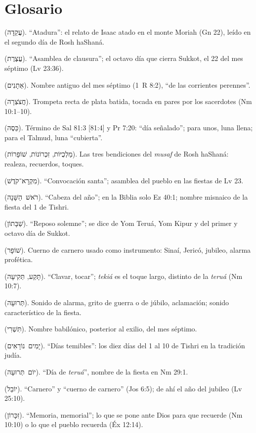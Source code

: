 \documentclass[11pt,letterpaper]{article}
\newcommand{\heb}[1]{\mbox{\foreignlanguage{hebrew}{#1}}}
\begin{document}
\section*{Glosario}
\begin{description}\setlength{\itemsep}{1pt}
\item[\emph{Aqedá}] (\heb{עֲקֵדָה}). ``Atadura'': el relato de Isaac atado en el monte Moriah (Gn 22), leído en el segundo día de Rosh haShaná.
\item[\emph{Atséret}] (\heb{עֲצֶרֶת}). ``Asamblea de clausura''; el octavo día que cierra Sukkot, el 22 del mes séptimo (Lv 23:36).
\item[\emph{Etanim}] (\heb{אֵתָנִים}). Nombre antiguo del mes séptimo (1~R 8:2), ``de las corrientes perennes''.
\item[\emph{Jatsotsrá}] (\heb{חֲצֹצְרָה}). Trompeta recta de plata batida, tocada en pares por los sacerdotes (Nm 10:1--10).
\item[\emph{Kese}] (\heb{כֵּסֶה}). Término de Sal 81:3 [81:4] y Pr 7:20: ``día señalado''; para unos, luna llena; para el Talmud, luna ``cubierta''.
\item[\emph{Maljuyot, zijronot, shofarot}] (\heb{מַלְכֻיּוֹת}, \heb{זִכְרוֹנוֹת}, \heb{שׁוֹפָרוֹת}). Las tres bendiciones del \emph{musaf} de Rosh haShaná: realeza, recuerdos, toques.
\item[\emph{Mikrá kódesh}] (\heb{מִקְרָא־קֹדֶשׁ}). ``Convocación santa''; asamblea del pueblo en las fiestas de Lv 23.
\item[\emph{Rosh haShaná}] (\heb{רֹאשׁ הַשָּׁנָה}). ``Cabeza del año''; en la Biblia solo Ez 40:1; nombre misnaico de la fiesta del 1 de Tishri.
\item[\emph{Shabatón}] (\heb{שַׁבָּתוֹן}). ``Reposo solemne''; se dice de Yom Teruá, Yom Kipur y del primer y octavo día de Sukkot.
\item[\emph{Shofar}] (\heb{שׁוֹפָר}). Cuerno de carnero usado como instrumento: Sinaí, Jericó, jubileo, alarma profética.
\item[\emph{Taqa'}, \emph{tekiá}] (\heb{תָּקַע}, \heb{תְּקִיעָה}). ``Clavar, tocar''; \emph{tekiá} es el toque largo, distinto de la \emph{teruá} (Nm 10:7).
\item[\emph{Teruá}] (\heb{תְּרוּעָה}). Sonido de alarma, grito de guerra o de júbilo, aclamación; sonido característico de la fiesta.
\item[\emph{Tishri}] (\heb{תִּשְׁרִי}). Nombre babilónico, posterior al exilio, del mes séptimo.
\item[\emph{Yamim noraim}] (\heb{יָמִים נוֹרָאִים}). ``Días temibles'': los diez días del 1 al 10 de Tishri en la tradición judía.
\item[\emph{Yom Teruá}] (\heb{יוֹם תְּרוּעָה}). ``Día de \emph{teruá}'', nombre de la fiesta en Nm 29:1.
\item[\emph{Yovel}] (\heb{יוֹבֵל}). ``Carnero'' y ``cuerno de carnero'' (Jos 6:5); de ahí el año del jubileo (Lv 25:10).
\item[\emph{Zikarón}, \emph{zijrón}] (\heb{זִכָּרוֹן}). ``Memoria, memorial''; lo que se pone ante Dios para que recuerde (Nm 10:10) o lo que el pueblo recuerda (Éx 12:14).
\end{description}
\end{document}
